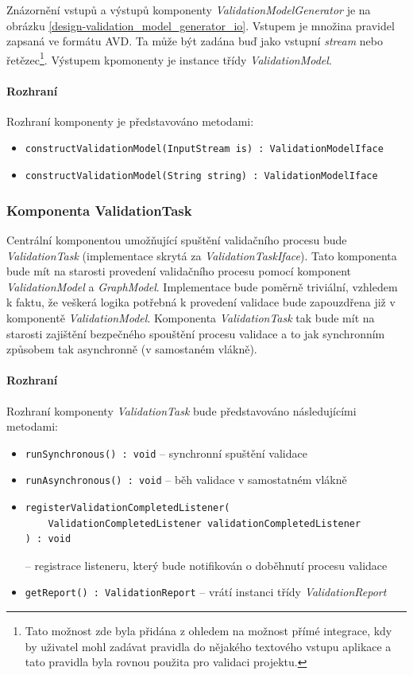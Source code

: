 Znázornění vstupů a výstupů komponenty \emph{ValidationModelGenerator} je na obrázku \ref{design-validation_model_generator_io}. Vstupem je množina pravidel zapsaná ve formátu AVD. Ta může být zadána buď jako vstupní \emph{stream} nebo řetězec\footnote{Tato možnost zde byla přidána z ohledem na možnost přímé integrace, kdy by uživatel mohl zadávat pravidla do nějakého textového vstupu aplikace a tato pravidla byla rovnou použita pro validaci projektu.}. Výstupem kpomonenty je instance třídy \emph{ValidationModel}.

\paragraph{Rozhraní} Rozhraní komponenty je představováno metodami:

\begin{itemize}
\item \verb-constructValidationModel(InputStream is) : ValidationModelIface-
\item \verb-constructValidationModel(String string) : ValidationModelIface-
\end{itemize}

\subsubsection{Komponenta ValidationTask}
\label{design-component_validation_task}
Centrální komponentou umožňující spuštění validačního procesu bude \emph{ValidationTask} (implementace skrytá za \emph{ValidationTaskIface}). Tato komponenta bude mít na starosti provedení validačního procesu pomocí komponent \emph{ValidationModel} a \emph{GraphModel}. Implementace bude poměrně triviální, vzhledem k faktu, že veškerá logika potřebná k provedení validace bude zapouzdřena již v komponentě \emph{ValidationModel}. Komponenta \emph{ValidationTask} tak bude mít na starosti zajištění bezpečného spouštění procesu validace a to jak synchronním způsobem tak asynchronně (v samostaném vlákně).

\paragraph{Rozhraní} Rozhraní komponenty \emph{ValidationTask} bude představováno následujícími metodami:
\begin{itemize}
\item \verb-runSynchronous() : void- -- synchronní spuštění validace
\item \verb-runAsynchronous() : void- -- běh validace v samostatném vlákně
\item \begin{verbatim}registerValidationCompletedListener(
    ValidationCompletedListener validationCompletedListener
) : void\end{verbatim} -- registrace listeneru, který bude notifikován o doběhnutí procesu validace
\item \verb-getReport() : ValidationReport- -- vrátí instanci třídy \emph{ValidationReport}
\end{itemize}

